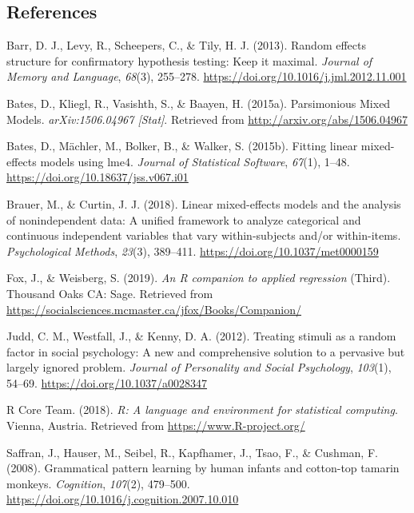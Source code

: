 \documentclass[english,man,man,floatsintext]{apa6}
\begin{document}
\begin{appendix}
\hypertarget{references}{%
\subsection{References}\label{references}}

\begingroup
\setlength{\parindent}{-0.5in}
\setlength{\leftskip}{0.5in}

\hypertarget{refs}{}
\leavevmode\hypertarget{ref-barr2013}{}%
Barr, D. J., Levy, R., Scheepers, C., \& Tily, H. J. (2013). Random
effects structure for confirmatory hypothesis testing: Keep it maximal.
\emph{Journal of Memory and Language}, \emph{68}(3), 255--278.
\url{https://doi.org/10.1016/j.jml.2012.11.001}

\leavevmode\hypertarget{ref-bates2015a}{}%
Bates, D., Kliegl, R., Vasishth, S., \& Baayen, H. (2015a). Parsimonious
Mixed Models. \emph{arXiv:1506.04967 {[}Stat{]}}. Retrieved from
\url{http://arxiv.org/abs/1506.04967}

\leavevmode\hypertarget{ref-bates2015}{}%
Bates, D., Mächler, M., Bolker, B., \& Walker, S. (2015b). Fitting
linear mixed-effects models using lme4. \emph{Journal of Statistical
Software}, \emph{67}(1), 1--48.
\url{https://doi.org/10.18637/jss.v067.i01}

\leavevmode\hypertarget{ref-brauer2018}{}%
Brauer, M., \& Curtin, J. J. (2018). Linear mixed-effects models and the
analysis of nonindependent data: A unified framework to analyze
categorical and continuous independent variables that vary
within-subjects and/or within-items. \emph{Psychological Methods},
\emph{23}(3), 389--411. \url{https://doi.org/10.1037/met0000159}

\leavevmode\hypertarget{ref-fox2019}{}%
Fox, J., \& Weisberg, S. (2019). \emph{An R companion to applied
regression} (Third). Thousand Oaks CA: Sage. Retrieved from
\url{https://socialsciences.mcmaster.ca/jfox/Books/Companion/}

\leavevmode\hypertarget{ref-judd2012}{}%
Judd, C. M., Westfall, J., \& Kenny, D. A. (2012). Treating stimuli as a
random factor in social psychology: A new and comprehensive solution to
a pervasive but largely ignored problem. \emph{Journal of Personality
and Social Psychology}, \emph{103}(1), 54--69.
\url{https://doi.org/10.1037/a0028347}

\leavevmode\hypertarget{ref-rcoreteam2018}{}%
R Core Team. (2018). \emph{R: A language and environment for statistical
computing}. Vienna, Austria. Retrieved from
\url{https://www.R-project.org/}

\leavevmode\hypertarget{ref-saffran2008}{}%
Saffran, J., Hauser, M., Seibel, R., Kapfhamer, J., Tsao, F., \&
Cushman, F. (2008). Grammatical pattern learning by human infants and
cotton-top tamarin monkeys. \emph{Cognition}, \emph{107}(2), 479--500.
\url{https://doi.org/10.1016/j.cognition.2007.10.010}


\end{appendix}
\end{document}
